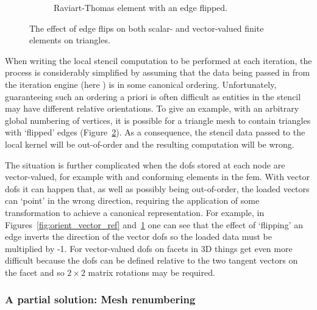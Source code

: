 \begin{figure}
\begin{subfigure}{0.45\textwidth}
    \caption{Raviart-Thomas element with an edge flipped.}
    \label{fig:orient_vector_flip}
  \end{subfigure}

  \caption{The effect of edge flips on both scalar- and vector-valued finite elements on triangles.}
  \label{fig:orient}
\end{figure}

When writing the local stencil computation to be performed at each iteration, the process is considerably simplified by assuming that the data being passed in from the iteration engine (here ) is in some canonical ordering.
Unfortunately, guaranteeing such an ordering a priori is often difficult as entities in the stencil may have different relative orientations.
To give an example, with an arbitrary global numbering of vertices, it is possible for a triangle mesh to contain triangles with `flipped' edges (Figure~\ref{fig:orient}).
As a consequence, the stencil data passed to the local kernel will be out-of-order and the resulting computation will be wrong.

The situation is further complicated when the \glspl{dof} stored at each node are vector-valued, for example with \hdiv and \hcurl conforming elements in the \gls{fem}.
With vector \glspl{dof} it can happen that, as well as possibly being out-of-order, the loaded vectors can `point' in the wrong direction, requiring the application of some transformation to achieve a canonical representation.
For example, in Figures~\ref{fig:orient_vector_ref} and~\ref{fig:orient_vector_flip} one can see that the effect of `flipping' an edge inverts the direction of the vector \glspl{dof} so the loaded data must be multiplied by -1.
For vector-valued \glspl{dof} on facets in 3D things get even more difficult because the \glspl{dof} can be defined relative to the two tangent vectors on the facet and so $2\times2$ matrix rotations may be required.

\subsubsection{A partial solution: Mesh renumbering}


